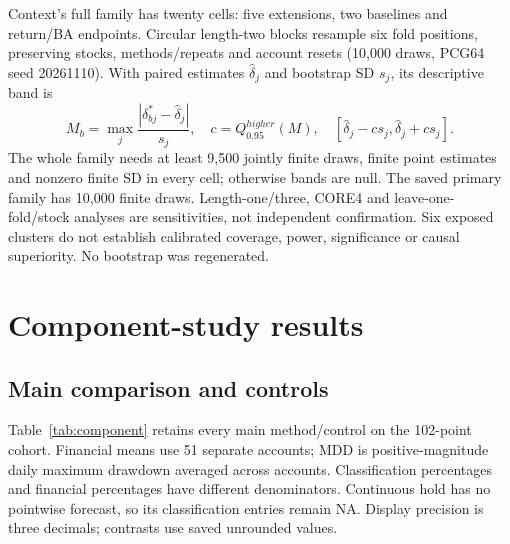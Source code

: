 Context's full family has twenty cells: five extensions, two baselines
and return/BA endpoints. Circular length-two blocks resample six fold
positions, preserving stocks, methods/repeats and account resets (10,000
draws, PCG64 seed 20261110). With paired estimates $\hat\delta_j$ and
bootstrap SD $s_j$, its descriptive band is
\begin{equation}
M_b=\max_j\frac{|\delta^*_{bj}-\hat\delta_j|}{s_j},\quad
c=Q_{0.95}^{higher}(M),\quad [\hat\delta_j-cs_j,\hat\delta_j+cs_j].
\end{equation}
The whole family needs at least 9,500 jointly finite draws, finite point
estimates and nonzero finite SD in every cell; otherwise bands are null.
The saved primary family has 10,000 finite draws. Length-one/three,
CORE4 and leave-one-fold/stock analyses are sensitivities, not independent
confirmation. Six exposed clusters do not establish calibrated coverage,
power, significance or causal superiority. No bootstrap was regenerated.

\section{Component-study results}\label{s:1859e39b7acb256f}
\subsection{Main comparison and controls}
Table~\ref{tab:component} retains every main method/control on the 102-point
cohort. Financial means use 51 separate accounts; MDD is positive-magnitude
daily maximum drawdown averaged across accounts. Classification percentages
and financial percentages have different denominators. Continuous hold has
no pointwise forecast, so its classification entries remain NA. Display
precision is three decimals; contrasts use saved unrounded values.

